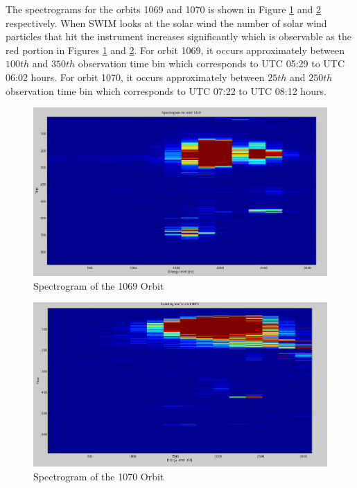 \documentclass{article}
\begin{document}
The spectrograms for the orbits 1069 and 1070 is shown in Figure \ref{fig:spectrogram_1069} and \ref{fig:spectrogram_1070} respectively. When SWIM looks at the solar wind the number of solar wind particles that hit the instrument increases significantly which is observable as the red portion in Figures \ref{fig:spectrogram_1069} and \ref{fig:spectrogram_1070}. For orbit 1069, it occurs approximately between $100th$ and $350th$ observation time bin which corresponds to UTC 05:29 to UTC 06:02 hours. For orbit 1070, it occurs approximately between $25th$ and $250th$ observation time bin which corresponds to UTC 07:22 to UTC 08:12 hours.

\begin{figure}[htb!]
\centering
\includegraphics[scale=0.35]{Figures/spectrogram_1069.png}
\caption{Spectrogram of the 1069 Orbit}
\label{fig:spectrogram_1069}
\end{figure}

\begin{figure}[htb!]
\centering
\includegraphics[scale=0.35]{Figures/spectrogram_1070.png}
\caption{Spectrogram of the 1070 Orbit}
\label{fig:spectrogram_1070}
\end{figure}
\end{document}
